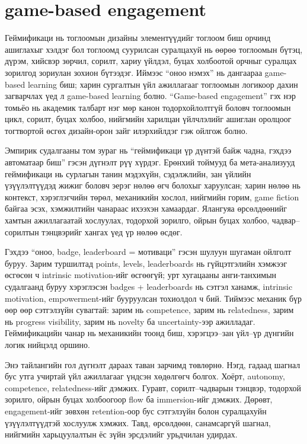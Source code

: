 \chapter{game-based engagement}
\begin{sloppy}
Геймификаци нь тоглоомын дизайны элементүүдийг тоглоом биш орчинд ашиглахыг хэлдэг бол тоглоомд суурилсан суралцахуй нь өөрөө тоглоомын бүтэц, дүрэм, хийсвэр зөрчил, сорилт, хариу үйлдэл, буцах холбоотой орчныг суралцах зорилгод зориулан зохион бүтээдэг. Иймээс ``оноо нэмэх'' нь дангаараа game-based learning биш; харин сургалтын үйл ажиллагааг тоглоомын логикоор дахин загварчлах үед л game-based learning болно. ``Game-based engagement'' гэх нэр томьёо нь академик талбарт нэг мөр канон тодорхойлолтгүй боловч тоглоомын цикл, сорилт, буцах холбоо, нийгмийн харилцан үйлчлэлийг ашиглан оролцоог тогтвортой өсгөх дизайн-орон зайг илэрхийлдэг гэж ойлгож болно.

Эмпирик судалгааны том зураг нь ``геймификаци үр дүнтэй байж чадна, гэхдээ автоматаар биш'' гэсэн дүгнэлт рүү хүрдэг. Ерөнхий тоймууд ба мета-анализууд геймификаци нь сурлагын танин мэдэхүйн, сэдэлжлийн, зан үйлийн үзүүлэлтүүдэд жижиг боловч эерэг нөлөө өгч болохыг харуулсан; харин нөлөө нь контекст, хэрэглэгчийн төрөл, механикийн хослол, нийгмийн горим, game fiction байгаа эсэх, хэмжилтийн чанараас ихээхэн хамаардаг. Ялангуяа өрсөлдөөнийг хамтын ажиллагаатай хослуулах, тодорхой зорилго, ойрын буцах холбоо, чадвар--сорилтын тэнцвэрийг хангах үед үр нөлөө өсдөг.

Гэхдээ ``оноо, badge, leaderboard = мотиваци'' гэсэн шулуун шугаман ойлголт буруу. Зарим туршилтад points, levels, leaderboards нь гүйцэтгэлийн хэмжээг өсгөсөн ч intrinsic motivation-ийг өсгөөгүй; урт хугацааны анги-танхимын судалгаанд буруу хэрэглэсэн badges + leaderboards нь сэтгэл ханамж, intrinsic motivation, empowerment-ийг бууруулсан тохиолдол ч бий. Тиймээс механик бүр өөр өөр сэтгэлзүйн сувагтай: зарим нь competence, зарим нь relatedness, зарим нь progress visibility, зарим нь novelty ба uncertainty-ээр ажилладаг. Геймификацийн чанар нь механикийн тоонд биш, хэрэгцээ--зан үйл--үр дүнгийн логик нийцэлд оршино.

Энэ тайлангийн гол дүгнэлт дараах таван зарчимд төвлөрнө. Нэгд, гадаад шагнал бус утга учиртай үйл ажиллагааг үндсэн хөдөлгөгч болгох. Хоёрт, autonomy, competence, relatedness-ийг дэмжих. Гуравт, сорилт--чадварын тэнцвэр, тодорхой зорилго, ойрын буцах холбоогоор flow ба immersion-ийг дэмжих. Дөрөвт, engagement-ийг зөвхөн retention-оор бус сэтгэлзүйн болон суралцахуйн үзүүлэлтүүдтэй хослуулж хэмжих. Тавд, өрсөлдөөн, санамсаргүй шагнал, нийгмийн харьцуулалтын ёс зүйн эрсдэлийг урьдчилан удирдах.


\end{sloppy}
